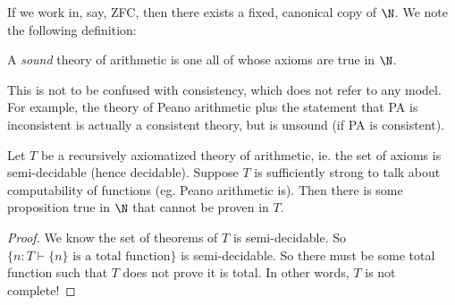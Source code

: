 \documentclass[a4paper]{article}
\newcommand\cif{{\color{blue} \mathsf{if}\;}}
\newcommand\cthen{{\color{blue}\;\mathsf{then}\;}}
\newcommand\celse{{\color{blue}\;\mathsf{else}\;}}
\begin{document}
If we work in, say, ZFC, then there exists a fixed, canonical copy of $\N$. We note the following definition:
\begin{defi}
  A \emph{sound} theory of arithmetic is one all of whose axioms are true in $\N$.
\end{defi}
This is not to be confused with consistency, which does not refer to any model. For example, the theory of Peano arithmetic plus the statement that PA is inconsistent is actually a consistent theory, but is unsound (if PA is consistent).

\begin{thm}
  Let $T$ be a recursively axiomatized theory of arithmetic, ie. the set of axioms is semi-decidable (hence decidable). Suppose $T$ is sufficiently strong to talk about computability of functions (eg. Peano arithmetic is). Then there is some proposition true in $\N$ that cannot be proven in $T$.
\end{thm}

\begin{proof}
  We know the set of theorems of $T$ is semi-decidable. So $\{n: T \vdash \{n\}\text{ is a total function}\}$ is semi-decidable. So there must be some total function such that $T$ does not prove it is total. In other words, $T$ is not complete!
\end{proof}



\end{document}

